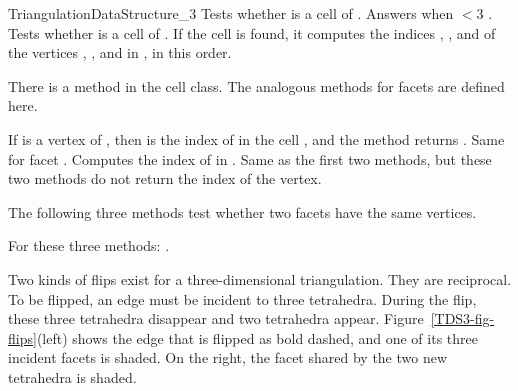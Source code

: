 \begin{ccRefConcept}{TriangulationDataStructure_3}
{Tests whether  is a cell of \ccVar. Answers  when
 $<3$ .}
{Tests whether  is a cell of \ccVar. If the cell
 is found, it computes the indices , , 
and  of the vertices , ,  and  in
, in this order.} 

There is a method  in the cell class. The analogous
methods for facets are defined here.

{If  is a vertex of , then  is the index of
 in the cell , and the method returns .
}
\ccGlue
{}
{Same for facet . Computes the index  of  in
.}
\ccGlue
{}
{}
\ccGlue
{}
{Same as the first two methods, but these two methods do not return the
index of the vertex.}

The following three methods test whether two facets have the same
vertices.

{}
\ccGlue
{}
{}
\ccGlue
{}
{For these three methods: .}


Two kinds of flips exist for a three-dimensional triangulation. They
are reciprocal. To be flipped, an edge must be incident to three
tetrahedra. During the flip, these three tetrahedra disappear and two
tetrahedra appear. Figure~\ref{TDS3-fig-flips}(left) shows the
edge that is flipped as bold dashed, and one of its three incident
facets is shaded. On the right, the facet shared by the two new
tetrahedra is shaded. 



\end{ccRefConcept}
